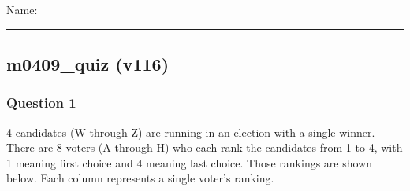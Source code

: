 \documentclass[
]{article}
\author{}
\date{\vspace{-2.5em}}
\begin{document}
\renewcommand{\arraystretch}{1.2}

Name: \vspace{0.1in}

\hrule

\hypertarget{m0409_quiz-v116}{%
\subsection{m0409\_quiz (v116)}\label{m0409_quiz-v116}}

\hypertarget{question-1}{%
\subsubsection{Question 1}\label{question-1}}

4 candidates (W through Z) are running in an election with a single
winner. There are 8 voters (A through H) who each rank the candidates
from 1 to 4, with 1 meaning first choice and 4 meaning last choice.
Those rankings are shown below. Each column represents a single voter's
ranking.
\end{document}
